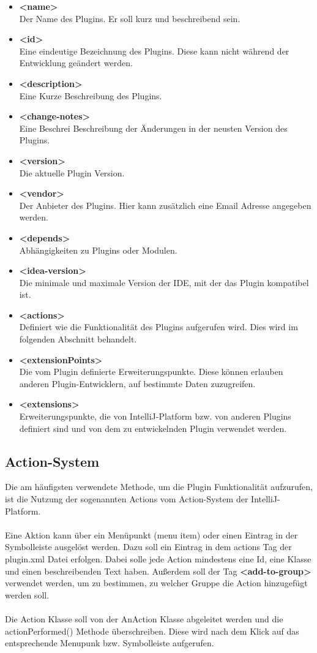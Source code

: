 \begin{itemize}
	\item \textbf{<name>} \\
	Der Name des Plugins. Er soll kurz und beschreibend sein.
	\item \textbf{<id>} \\
	Eine eindeutige Bezeichnung des Plugins. Diese kann nicht während der Entwicklung geändert werden.
	\item \textbf{<description>} \\
	Eine Kurze Beschreibung des Plugins.
	\item \textbf{<change-notes>} \\
	Eine Beschrei Beschreibung der Änderungen in der neusten Version des Plugins.
	\item \textbf{<version>} \\
	Die aktuelle Plugin Version.
	\item \textbf{<vendor>} \\
	Der Anbieter des Plugins. Hier kann zusätzlich eine Email Adresse angegeben werden.
	\item \textbf{<depends>} \\
	Abhängigkeiten zu Plugins oder Modulen.
	\item \textbf{<idea-version>} \\
	Die minimale und maximale Version der IDE, mit der das Plugin kompatibel ist.
	\item \textbf{<actions>} \\
	Definiert wie die Funktionalität des Plugins aufgerufen wird. Dies wird im folgenden Abschnitt behandelt.
	\item \textbf{<extensionPoints>} \\
	Die vom Plugin definierte Erweiterungspunkte. Diese können erlauben anderen Plugin-Entwicklern, auf bestimmte Daten zuzugreifen. 
	\item \textbf{<extensions>} \\
	Erweiterungspunkte, die von IntelliJ-Platform bzw. von anderen Plugins definiert sind und von dem zu entwickelnden Plugin verwendet werden.
\end{itemize}
\subsection{Action-System}
Die am häufigsten verwendete Methode, um die Plugin Funktionalität aufzurufen, ist die Nutzung der sogenannten Actions vom Action-System der IntelliJ-Platform.\\ \\
Eine Aktion kann über ein Menüpunkt (menu item) oder einen Eintrag in der Symbolleiste ausgelöst werden. Dazu soll ein Eintrag in dem actions Tag der plugin.xml Datei erfolgen. Dabei solle jede Action mindestens eine Id, eine Klasse und einen beschreibenden Text haben. Außerdem soll der Tag \textbf{<add-to-group>} verwendet werden, um zu bestimmen, zu welcher Gruppe die Action hinzugefügt werden soll.\\ \\
Die Action Klasse soll von der AnAction Klasse abgeleitet werden und die actionPerformed() Methode überschreiben. Diese wird nach dem Klick auf das entsprechende Menupunk bzw. Symbolleiste aufgerufen.

